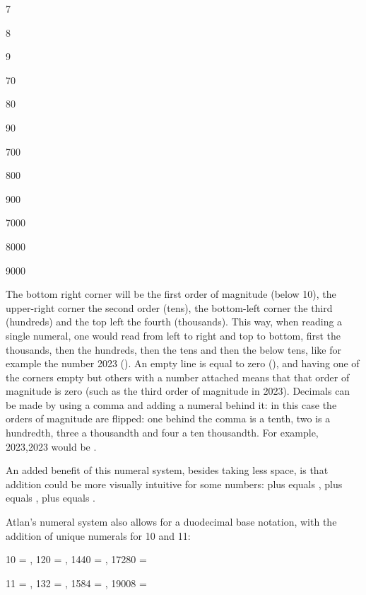 \begin{multicols}{4}
\small
7   

8   

9   	
\columnbreak

70   

80   

90   


\columnbreak

700   

800   

900   

\columnbreak

7000   

8000   

9000   



\end{multicols}

The bottom right corner will be the first order of magnitude (below 10), the upper-right corner the second order (tens), the bottom-left corner the third (hundreds) and the top left the fourth (thousands). This way, when reading a single numeral, one would read from left to right and top to bottom, first the thousands, then the hundreds, then the tens and then the below tens, like for example the number 2023 (). An empty line is equal to zero (), and having one of the corners empty but others with a number attached means that that order of magnitude is zero (such as the third order of magnitude in 2023). Decimals can be made by using a comma and adding a numeral behind it: in this case the orders of magnitude are flipped: one behind the comma is a tenth, two is a hundredth, three a thousandth and four a ten thousandth. For example, 2023,2023 would be \comma{}. 

An added benefit of this numeral system, besides taking less space, is that addition could be more visually intuitive for some numbers:  plus  equals ,  plus  equals ,  plus  equals . 

Atlan’s numeral system also allows for a duodecimal base notation, with the addition of unique numerals for 10 and 11: 

\vspace{0.2cm}
{\small
10 = , 120 = , 1440 = , 17280 =  

11 = , 132 = , 1584 = , 19008 =  
}
\vspace{0.2cm}


